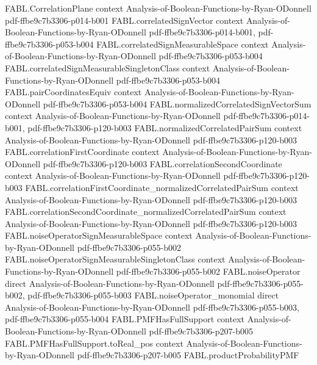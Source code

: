 \begin{theorem}
\proofstep
  {FABL.CorrelationPlane}
  {context}
  {Analysis-of-Boolean-Functions-by-Ryan-ODonnell}
  {pdf-ffbe9c7b3306-p014-b001}
\proofstep
  {FABL.correlatedSignVector}
  {context}
  {Analysis-of-Boolean-Functions-by-Ryan-ODonnell}
  {pdf-ffbe9c7b3306-p014-b001,
    pdf-ffbe9c7b3306-p053-b004}
\proofstep
  {FABL.correlatedSignMeasurableSpace}
  {context}
  {Analysis-of-Boolean-Functions-by-Ryan-ODonnell}
  {pdf-ffbe9c7b3306-p053-b004}
\proofstep
  {FABL.correlatedSignMeasurableSingletonClass}
  {context}
  {Analysis-of-Boolean-Functions-by-Ryan-ODonnell}
  {pdf-ffbe9c7b3306-p053-b004}
\proofstep
  {FABL.pairCoordinatesEquiv}
  {context}
  {Analysis-of-Boolean-Functions-by-Ryan-ODonnell}
  {pdf-ffbe9c7b3306-p053-b004}
\proofstep
  {FABL.normalizedCorrelatedSignVectorSum}
  {context}
  {Analysis-of-Boolean-Functions-by-Ryan-ODonnell}
  {pdf-ffbe9c7b3306-p014-b001,
    pdf-ffbe9c7b3306-p120-b003}
\proofstep
  {FABL.normalizedCorrelatedPairSum}
  {context}
  {Analysis-of-Boolean-Functions-by-Ryan-ODonnell}
  {pdf-ffbe9c7b3306-p120-b003}
\proofstep
  {FABL.correlationFirstCoordinate}
  {context}
  {Analysis-of-Boolean-Functions-by-Ryan-ODonnell}
  {pdf-ffbe9c7b3306-p120-b003}
\proofstep
  {FABL.correlationSecondCoordinate}
  {context}
  {Analysis-of-Boolean-Functions-by-Ryan-ODonnell}
  {pdf-ffbe9c7b3306-p120-b003}
\proofstep
  {FABL.correlationFirstCoordinate_normalizedCorrelatedPairSum}
  {context}
  {Analysis-of-Boolean-Functions-by-Ryan-ODonnell}
  {pdf-ffbe9c7b3306-p120-b003}
\proofstep
  {FABL.correlationSecondCoordinate_normalizedCorrelatedPairSum}
  {context}
  {Analysis-of-Boolean-Functions-by-Ryan-ODonnell}
  {pdf-ffbe9c7b3306-p120-b003}
\proofstep
  {FABL.noiseOperatorSignMeasurableSpace}
  {context}
  {Analysis-of-Boolean-Functions-by-Ryan-ODonnell}
  {pdf-ffbe9c7b3306-p055-b002}
\proofstep
  {FABL.noiseOperatorSignMeasurableSingletonClass}
  {context}
  {Analysis-of-Boolean-Functions-by-Ryan-ODonnell}
  {pdf-ffbe9c7b3306-p055-b002}
\proofstep
  {FABL.noiseOperator}
  {direct}
  {Analysis-of-Boolean-Functions-by-Ryan-ODonnell}
  {pdf-ffbe9c7b3306-p055-b002,
    pdf-ffbe9c7b3306-p055-b003}
\proofstep
  {FABL.noiseOperator_monomial}
  {direct}
  {Analysis-of-Boolean-Functions-by-Ryan-ODonnell}
  {pdf-ffbe9c7b3306-p055-b003,
    pdf-ffbe9c7b3306-p055-b004}
\proofstep
  {FABL.PMFHasFullSupport}
  {context}
  {Analysis-of-Boolean-Functions-by-Ryan-ODonnell}
  {pdf-ffbe9c7b3306-p207-b005}
\proofstep
  {FABL.PMFHasFullSupport.toReal_pos}
  {context}
  {Analysis-of-Boolean-Functions-by-Ryan-ODonnell}
  {pdf-ffbe9c7b3306-p207-b005}
\proofstep
  {FABL.productProbabilityPMF}

\end{theorem}
